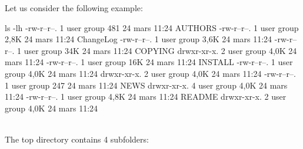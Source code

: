 Let us consider the following example:
{\footnotesize{
\begin{script}
 ls -lh
-rw-r--r--. 1 user group  481 24 mars  11:24 AUTHORS
-rw-r--r--. 1 user group 2,8K 24 mars  11:24 ChangeLog
-rw-r--r--. 1 user group 3,6K 24 mars  11:24 
-rw-r--r--. 1 user group  34K 24 mars  11:24 COPYING
drwxr-xr-x. 2 user group 4,0K 24 mars  11:24 
-rw-r--r--. 1 user group  16K 24 mars  11:24 INSTALL
-rw-r--r--. 1 user group 4,0K 24 mars  11:24 
drwxr-xr-x. 2 user group 4,0K 24 mars  11:24 
-rw-r--r--. 1 user group  247 24 mars  11:24 NEWS
drwxr-xr-x. 4 user group 4,0K 24 mars  11:24 
-rw-r--r--. 1 user group 4,8K 24 mars  11:24 README
drwxr-xr-x. 2 user group 4,0K 24 mars  11:24 
\end{script}
}}
\vspace{-0.25cm}
\\
\noindent The top directory contains 4 subfolders:
